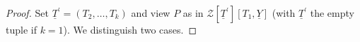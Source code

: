 \documentclass[11pt,a4paper,reqno]{amsart}
\newcommand\AB[1] {\textcolor{red}{{#1}}}
\newtheorem{lem}[thm]{Lemma}
\theoremstyle{definition}
\begin{document}




\begin{proof} Set ${\underline T}^\prime = (T_2,\ldots,T_k)$ and view  $P$ as in ${\mathcal Z}[{\underline T}^\prime][T_1,{\underline Y}]$ (with ${\underline T}^\prime$ the empty tuple if $k=1$). We distinguish two cases.
\vskip 1mm

\noindent


\end{proof}
\end{document}
